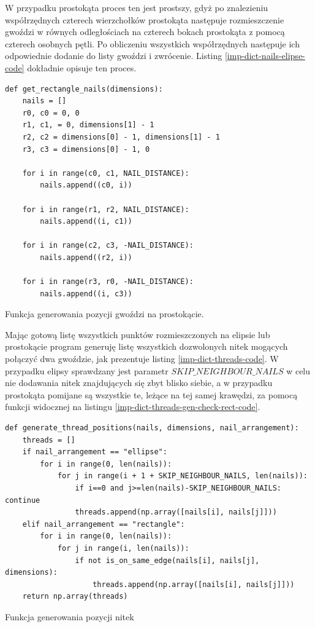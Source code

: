 \documentclass[a4paper, 12pt, polish, twoside]{extreport}
\begin{document}
        W przypadku prostokąta proces ten jest prostszy, gdyż po znalezieniu współrzędnych czterech wierzchołków prostokąta następuje rozmieszczenie gwoździ w równych odległościach na czterech bokach prostokąta z pomocą czterech osobnych pętli. Po obliczeniu wszystkich współrzędnych następuje ich odpowiednie dodanie do listy gwoździ i zwrócenie. Listing \ref{imp-dict-nails-elipse-code} dokładnie opisuje ten proces.
        \begin{code}[H]
        \begin{verbatim}
def get_rectangle_nails(dimensions):
    nails = []
    r0, c0 = 0, 0
    r1, c1, = 0, dimensions[1] - 1
    r2, c2 = dimensions[0] - 1, dimensions[1] - 1
    r3, c3 = dimensions[0] - 1, 0

    for i in range(c0, c1, NAIL_DISTANCE):
        nails.append((c0, i))

    for i in range(r1, r2, NAIL_DISTANCE):
        nails.append((i, c1))

    for i in range(c2, c3, -NAIL_DISTANCE):
        nails.append((r2, i))
        
    for i in range(r3, r0, -NAIL_DISTANCE):
        nails.append((i, c3))
        \end{verbatim}
        \caption{Funkcja generowania pozycji gwoździ na prostokącie.}
        \label{imp-dict-nails-rectange-code}
        \end{code}
        
        Mając gotową listę wszystkich punktów rozmieszczonych na elipsie lub prostokącie program generuję listę wszystkich dozwolonych nitek mogących połączyć dwa gwoździe, jak prezentuje listing \ref{imp-dict-threads-code}. W przypadku elipsy sprawdzany jest parametr \(SKIP\_NEIGHBOUR\_NAILS\) w celu nie dodawania nitek znajdujących się zbyt blisko siebie, a w przypadku prostokąta pomijane są wszystkie te, leżące na tej samej krawędzi, za pomocą funkcji widocznej na listingu \ref{imp-dict-threads-gen-check-rect-code}. 
        \begin{code}[H]
        \begin{verbatim}
def generate_thread_positions(nails, dimensions, nail_arrangement):
    threads = []
    if nail_arrangement == "ellipse":
        for i in range(0, len(nails)):
            for j in range(i + 1 + SKIP_NEIGHBOUR_NAILS, len(nails)):
                if i==0 and j>=len(nails)-SKIP_NEIGHBOUR_NAILS: continue
                threads.append(np.array([nails[i], nails[j]]))
    elif nail_arrangement == "rectangle":
        for i in range(0, len(nails)):
            for j in range(i, len(nails)):
                if not is_on_same_edge(nails[i], nails[j], dimensions):
                    threads.append(np.array([nails[i], nails[j]]))
    return np.array(threads)
        \end{verbatim}
        \caption{Funkcja generowania pozycji nitek}
        \label{imp-dict-threads-code}
        \end{code}
        
\end{document}

